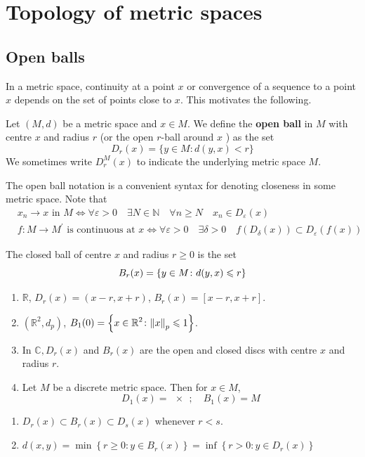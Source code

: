 \documentclass[a4paper]{article}
\begin{document}
\section{Topology of metric spaces}
\subsection{Open balls}
In a metric space, continuity at a point $x$ or convergence of a sequence to a point $x$ depends on the set of points close to $x$. This motivates the following.
\begin{definition}
	Let $(M, d)$ be a metric space and $x \in M$. We define the \textbf{open ball} in $M$ with centre $x$ and radius $r$ (or the open $r$-ball around $x$ ) as the set
    \[
    D_r(x)=\{y \in M: d(y, x)<r\}
    \]
    We sometimes write $D_r^M(x)$ to indicate the underlying metric space $M$.
\end{definition}
The open ball notation is a convenient syntax for denoting closeness in some metric space.
Note that
\[
    \begin{aligned}
        &x_n \rightarrow x \text { in } M \Longleftrightarrow \forall \varepsilon>0\quad \exists N \in \mathbb{N}\quad \forall n \geqslant N \quad x_n \in D_{\varepsilon}(x) \\
        &f: M \rightarrow M^{\prime} \text { is continuous at } x \Longleftrightarrow \forall \varepsilon>0\quad \exists \delta>0\quad f\left(D_\delta(x)\right) \subset D_{\varepsilon}(f(x))
    \end{aligned}
\]
\begin{definition}
	The closed ball of centre \( x \) and radius \( r \geq 0 \) is the set
	\[
		B_r(x) = \qty{y \in M \colon d(y,x) \leqslant r}
	\]
\end{definition}
\begin{example} 
	\begin{enumerate}
        \item \( \mathbb R \), \( D_r(x) = (x-r,x+r) \),
        \( B_r(x) = [x-r,x+r] \).
        \item \( (\mathbb R^2, d_p) \), $\displaystyle B_1(0) = \left\{ x \in \mathbb R^2 \colon \norm{x}_p \leqslant 1  \right\}$. 
        \item In $\mathbb{C}, D_r(x)$ and $B_r(x)$ are the open and closed discs with centre $x$ and radius $r$.
        \item Let \( M \) be a discrete metric space.
        Then for \( x \in M \),
        \[
            D_1(x) = \qty{x};\quad B_1(x) = M
        \]
    \end{enumerate}
\end{example}
\begin{note}
	\begin{enumerate}
        \item $D_r(x) \subset B_r(x) \subset D_s(x)$ whenever $r<s$.
        \item $d(x, y)=\min \left\{r \geqslant 0: y \in B_r(x)\right\}=\inf \left\{r>0: y \in D_r(x)\right\}$
    \end{enumerate}
\end{note}
\end{document}
